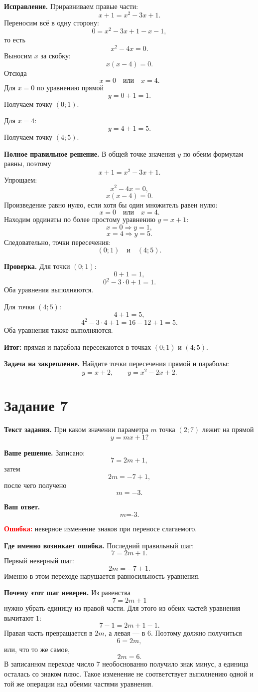 \documentclass[12pt,a4paper]{article}
\newcommand{\studentanswer}[1]{\textit{#1}}
\begin{document}
\textbf{Исправление.}
Приравниваем правые части:
\[
x+1=x^2-3x+1.
\]
Переносим всё в одну сторону:
\[
0=x^2-3x+1-x-1,
\]
то есть
\[
x^2-4x=0.
\]
Выносим $x$ за скобку:
\[
x(x-4)=0.
\]
Отсюда
\[
x=0 \quad \text{или} \quad x=4.
\]
Для $x=0$ по уравнению прямой
\[
y=0+1=1.
\]
Получаем точку $(0;1)$.

Для $x=4$:
\[
y=4+1=5.
\]
Получаем точку $(4;5)$.

\textbf{Полное правильное решение.}
В общей точке значения $y$ по обеим формулам равны, поэтому
\[
x+1=x^2-3x+1.
\]
Упрощаем:
\[
x^2-4x=0,
\]
\[
x(x-4)=0.
\]
Произведение равно нулю, если хотя бы один множитель равен нулю:
\[
x=0 \quad \text{или} \quad x=4.
\]
Находим ординаты по более простому уравнению $y=x+1$:
\[
x=0 \Rightarrow y=1,
\]
\[
x=4 \Rightarrow y=5.
\]
Следовательно, точки пересечения:
\[
(0;1) \quad \text{и} \quad (4;5).
\]

\textbf{Проверка.}
Для точки $(0;1)$:
\[
0+1=1,
\]
\[
0^2-3\cdot 0+1=1.
\]
Оба уравнения выполняются.

Для точки $(4;5)$:
\[
4+1=5,
\]
\[
4^2-3\cdot 4+1=16-12+1=5.
\]
Оба уравнения также выполняются.

\textcolor{teal!60!black}{\textbf{Итог:}}
прямая и парабола пересекаются в точках $(0;1)$ и $(4;5)$.

\textbf{Задача на закрепление.}
Найдите точки пересечения прямой и параболы:
\[
y=x+2, \qquad y=x^2-2x+2.
\]

\newpage
{}\label{task:7}
\section*{Задание 7}

\textbf{Текст задания.}
При каком значении параметра $m$ точка $(2;7)$ лежит на прямой
\[
y=mx+1?
\]

\textbf{Ваше решение.}
Записано:
\[
7=2m+1,
\]
затем
\[
2m=-7+1,
\]
после чего получено
\[
m=-3.
\]

\textbf{Ваш ответ.}
\[
\studentanswer{m=-3.}
\]

\textcolor{red}{\textbf{Ошибка:}} неверное изменение знаков при переносе слагаемого.

\textbf{Где именно возникает ошибка.}
Последний правильный шаг:
\[
7=2m+1.
\]
Первый неверный шаг:
\[
2m=-7+1.
\]
Именно в этом переходе нарушается равносильность уравнения.

\textbf{Почему этот шаг неверен.}
Из равенства
\[
7=2m+1
\]
нужно убрать единицу из правой части. Для этого из обеих частей уравнения вычитают $1$:
\[
7-1=2m+1-1.
\]
Правая часть превращается в $2m$, а левая --- в $6$. Поэтому должно получиться
\[
6=2m,
\]
или, что то же самое,
\[
2m=6.
\]
В записанном переходе число $7$ необоснованно получило знак минус, а единица осталась со знаком плюс. Такое изменение не соответствует выполнению одной и той же операции над обеими частями уравнения.
\end{document}

